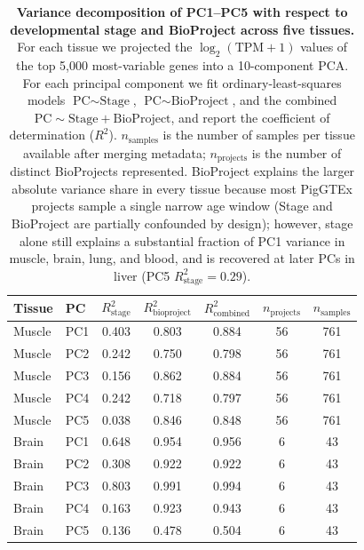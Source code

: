 \documentclass[10pt,a4paper]{article}
\begin{document}
\clearpage
\begin{table}[H]
  \centering
  \caption{\textbf{Variance decomposition of PC1--PC5 with respect to developmental stage and BioProject across five tissues.} For each tissue we projected the $\log_2(\text{TPM}+1)$ values of the top 5{,}000 most-variable genes into a 10-component PCA. For each principal component we fit ordinary-least-squares models $\text{PC} \sim \text{Stage}$, $\text{PC} \sim \text{BioProject}$, and the combined $\text{PC} \sim \text{Stage} + \text{BioProject}$, and report the coefficient of determination ($R^2$). $n_{\text{samples}}$ is the number of samples per tissue available after merging metadata; $n_{\text{projects}}$ is the number of distinct BioProjects represented. BioProject explains the larger absolute variance share in every tissue because most PigGTEx projects sample a single narrow age window (Stage and BioProject are partially confounded by design); however, stage alone still explains a substantial fraction of PC1 variance in muscle, brain, lung, and blood, and is recovered at later PCs in liver (PC5 $R^2_{\text{stage}} = 0.29$).}
  \label{tab:S6}
  \footnotesize
  \setlength{\tabcolsep}{4pt}
  \begin{tabular}{llccccc}
    \toprule
    Tissue & PC & $R^2_{\text{stage}}$ & $R^2_{\text{bioproject}}$ & $R^2_{\text{combined}}$ & $n_{\text{projects}}$ & $n_{\text{samples}}$ \\
    \midrule
    Muscle & PC1 & 0.403 & 0.803 & 0.884 & 56 & 761 \\
    Muscle & PC2 & 0.242 & 0.750 & 0.798 & 56 & 761 \\
    Muscle & PC3 & 0.156 & 0.862 & 0.884 & 56 & 761 \\
    Muscle & PC4 & 0.242 & 0.718 & 0.797 & 56 & 761 \\
    Muscle & PC5 & 0.038 & 0.846 & 0.848 & 56 & 761 \\
    \midrule
    Brain & PC1 & 0.648 & 0.954 & 0.956 & 6 & 43 \\
    Brain & PC2 & 0.308 & 0.922 & 0.922 & 6 & 43 \\
    Brain & PC3 & 0.803 & 0.991 & 0.994 & 6 & 43 \\
    Brain & PC4 & 0.163 & 0.923 & 0.943 & 6 & 43 \\
    Brain & PC5 & 0.136 & 0.478 & 0.504 & 6 & 43 \\

\end{tabular}
\end{table}
\end{document}

